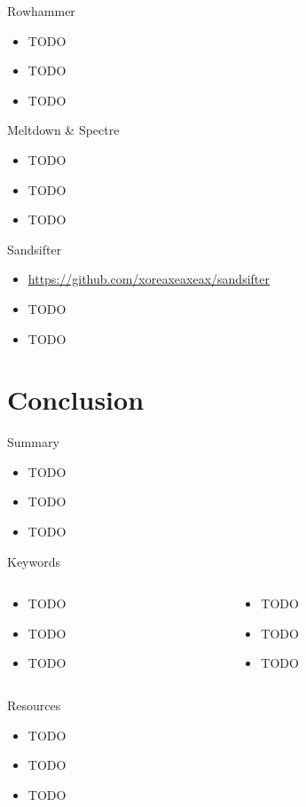 \documentclass{curs}
\begin{document}
\begin{frame}{Rowhammer}
  \begin{itemize}
    \item TODO
    \item TODO
    \item TODO
  \end{itemize}
\end{frame}

\begin{frame}{Meltdown \& Spectre}
  \begin{itemize}
    \item TODO
    \item TODO
    \item TODO
  \end{itemize}
\end{frame}

\begin{frame}{Sandsifter}
  \begin{itemize}
    \item \url{https://github.com/xoreaxeaxeax/sandsifter}
    \item TODO
    \item TODO
  \end{itemize}
\end{frame}


\section{Conclusion}

\begin{frame}{Summary}
  \begin{itemize}
    \item TODO
    \item TODO
    \item TODO
  \end{itemize}
\end{frame}

\begin{frame}{Keywords}
  \begin{columns}
    \begin{column}{0.5\textwidth}
      \begin{itemize}
        \item TODO
        \item TODO
        \item TODO
      \end{itemize}
    \end{column}
    \begin{column}{0.5\textwidth}
      \begin{itemize}
        \item TODO
        \item TODO
        \item TODO
      \end{itemize}
    \end{column}
  \end{columns}
\end{frame}

\begin{frame}{Resources}
  \begin{itemize}
    \item TODO
    \item TODO
    \item TODO
  \end{itemize}
\end{frame}
\end{document}
